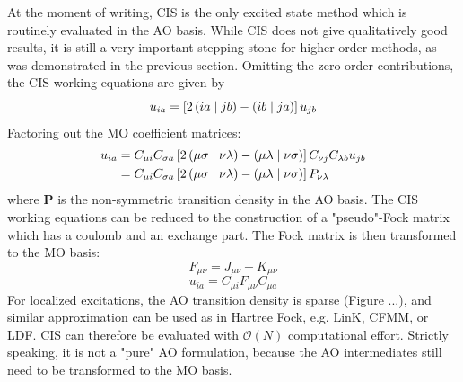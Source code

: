 At the moment of writing, CIS is the only excited state method which is routinely evaluated in the AO basis. While CIS does not give qualitatively good results, it is still a very important stepping stone for higher order methods, as was demonstrated in the previous section. Omitting the zero-order contributions, the CIS working equations are given by
\begin{equation}
u_{ia} = \left[ 2 \left( ia \mid jb \right) - \left( ib \mid ja \right) \right] u_{jb}
\end{equation}
\noindent Factoring out the MO coefficient matrices:
\begin{equation}
\begin{split}
u_{ia} &= C_{\mu i} C_{\sigma a} \left[ 2 \left( \mu\sigma \mid \nu\lambda \right) - \left( \mu\lambda \mid \nu\sigma \right) \right] C_{\nu j} C_{\lambda b} u_{jb} \\ 
&= C_{\mu i} C_{\sigma a} \left[ 2 \left( \mu\sigma \mid \nu\lambda \right) - \left( \mu\lambda \mid \nu\sigma \right) \right] P_{\nu\lambda} 
\end{split}
\end{equation} 
\noindent where $\mathbf{P}$ is the non-symmetric transition density in the AO basis. The CIS working equations can be reduced to the construction of a "pseudo"-Fock matrix which has a coulomb and an exchange part. The Fock matrix is then transformed to the MO basis:
\begin{equation}
F_{\mu\nu} = J_{\mu\nu} + K_{\mu\nu}  
\end{equation}
\begin{equation}
u_{ia} = C_{\mu i} F_{\mu\nu} C_{\mu a}  
\end{equation}
\noindent For localized excitations, the AO transition density is sparse (Figure ...), and similar approximation can be used as in Hartree Fock, e.g. LinK, CFMM, or LDF. CIS can therefore be evaluated with $\mathcal{O}(N)$ computational effort. Strictly speaking, it is not a "pure" AO formulation, because the AO intermediates still need to be transformed to the MO basis.

